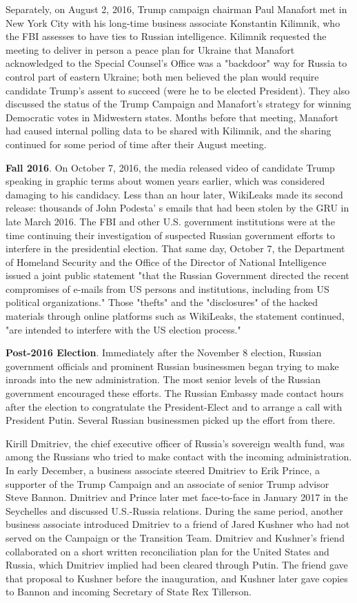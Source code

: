 \documentclass{article}
\begin{document}
Separately, on August 2, 2016, Trump campaign chairman Paul Manafort met in New York City with his long-time business associate Konstantin Kilimnik, who the FBI assesses to have ties to Russian intelligence. Kilimnik requested the meeting to deliver in person a  peace plan for Ukraine that Manafort acknowledged to the Special Counsel's Office was a "backdoor" way for Russia to control part of eastern Ukraine; both men believed the plan would require candidate Trump's  assent to succeed (were he to be elected President). They also discussed the status of the Trump Campaign and Manafort's strategy for winning Democratic votes in Midwestern states. Months before that meeting, Manafort had caused internal polling data to be shared with Kilimnik, and the sharing continued for some period of time after their August meeting.

\textbf{Fall 2016}. On October 7, 2016, the media released video of candidate Trump speaking in graphic terms about women years earlier, which was considered damaging to his candidacy. Less than an hour later, WikiLeaks made its second release: thousands of John Podesta' s emails that had been stolen by the GRU in late March 2016. The FBI and other U.S. government institutions were at the time continuing their investigation of suspected Russian government efforts to interfere in the presidential election. That same day, October 7, the Department of Homeland Security and the Office of the Director of National Intelligence issued a joint public statement "that the Russian Government directed the recent compromises of e-mails from US persons and institutions, including from US political organizations." Those "thefts" and the "disclosures"  of the hacked materials through online platforms such as WikiLeaks, the statement continued, "are intended to interfere with the US election process."

\textbf{Post-2016 Election}. Immediately after the November 8  election,  Russian government officials and prominent Russian businessmen began trying to make inroads into the new administration. The most senior levels of the Russian government encouraged these efforts. The Russian Embassy made contact hours after the election to congratulate the President-Elect and to arrange a call with President Putin. Several Russian businessmen picked up the effort from there.

Kirill Dmitriev, the chief executive officer of Russia's sovereign wealth fund, was among the Russians who tried to make contact with the incoming administration. In early December, a business associate steered Dmitriev to Erik Prince, a  supporter of the Trump Campaign and an associate of senior Trump advisor Steve Bannon. Dmitriev and Prince later met face-to-face in January 2017 in the Seychelles and discussed U.S.-Russia relations. During the same period, another business associate introduced Dmitriev to a  friend of Jared Kushner who had not served on the Campaign or the Transition Team. Dmitriev and Kushner's friend collaborated on a short written reconciliation plan for the United States and Russia, which Dmitriev implied had been cleared through Putin. The friend gave that proposal to Kushner before the inauguration,  and Kushner later gave copies to Bannon and incoming Secretary of State Rex Tillerson.
\end{document}
